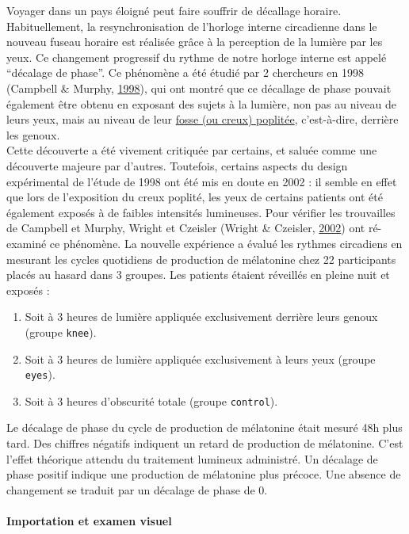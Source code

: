 \documentclass[a4paperpaper,]{article}
\providecommand{\tightlist}{%
  \setlength{\itemsep}{0pt}\setlength{\parskip}{0pt}}
\let\oldparagraph\paragraph
\renewcommand{\paragraph}[1]{\oldparagraph{#1}\mbox{}}
\begin{document}
Voyager dans un pays éloigné peut faire souffrir de décallage horaire. Habituellement, la resynchronisation de l'horloge interne circadienne dans le nouveau fuseau horaire est réalisée grâce à la perception de la lumière
par les yeux. Ce changement progressif du rythme de notre horloge interne est appelé ``décalage de phase''. Ce phénomène a été étudié par 2 chercheurs en 1998 (Campbell \& Murphy, \protect\hyperlink{ref-Campbell1998}{1998}), qui ont montré que ce décallage de phase pouvait également être obtenu en exposant des sujets à la lumière, non pas au niveau de leurs yeux, mais au niveau de leur \href{https://fr.wikipedia.org/wiki/Fosse_poplitée}{fosse (ou creux) poplitée}, c'est-à-dire, derrière les genoux.\\
Cette découverte a été vivement critiquée par certains, et saluée comme une découverte majeure par d'autres. Toutefois, certains aspects du design expérimental de l'étude de 1998 ont été mis en doute en 2002 : il semble en effet que lors de l'exposition du creux poplité, les yeux de certains patients ont été également exposés à de faibles intensités lumineuses. Pour vérifier les trouvailles de Campbell et Murphy, Wright et Czeisler (Wright \& Czeisler, \protect\hyperlink{ref-Wright2002}{2002}) ont ré-examiné ce phénomène. La nouvelle expérience a évalué les rythmes circadiens en mesurant les cycles quotidiens de production de mélatonine chez 22 participants placés au hasard dans 3 groupes. Les patients étaient réveillés en pleine nuit et exposés :

\begin{enumerate}
\def\labelenumi{\arabic{enumi}.}
\tightlist
\item
  Soit à 3 heures de lumière appliquée exclusivement derrière leurs genoux (groupe \texttt{knee}).
\item
  Soit à 3 heures de lumière appliquée exclusivement à leurs yeux (groupe \texttt{eyes}).
\item
  Soit à 3 heures d'obscurité totale (groupe \texttt{control}).
\end{enumerate}

Le décalage de phase du cycle de production de mélatonine était mesuré 48h plus tard. Des chiffres négatifs indiquent un retard de production de mélatonine. C'est l'effet théorique attendu du traitement lumineux administré. Un décalage de phase positif indique une production de mélatonine plus précoce. Une absence de changement se traduit par un décalage de phase de 0.

\hypertarget{importation-et-examen-visuel-3}{%
\paragraph{Importation et examen visuel}\label{importation-et-examen-visuel-3}}
\end{document}
